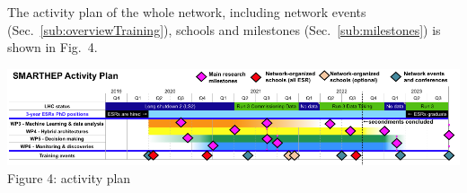 The activity plan of the whole network, including network events (Sec.~\ref{sub:overviewTraining}), schools and milestones (Sec.~\ref{sub:milestones}) is shown in Fig.~4. 
\begin{center}
\includegraphics[width=\textwidth]{figs/Workplan.png} %
\footnotesize{Figure 4: \acronym activity plan}
\end{center}
\vspace{-5mm}

\FloatBarrier
\vspace{-8mm}
